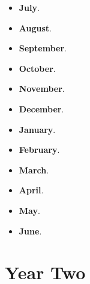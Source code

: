 \documentclass[iwp,first]{luthesis}
\begin{document}
\begin{itemize}

	\item {\bf July}.

	\item {\bf August}.
 
	\item {\bf September}.

	\item {\bf October}.

	\item {\bf November}.

	\item {\bf December}.

	\item {\bf January}.

	\item {\bf February}.

	\item {\bf March}.

	\item {\bf April}.

	\item {\bf May}.

	\item {\bf June}.

\end{itemize}


\section{Year Two}
\end{document}
